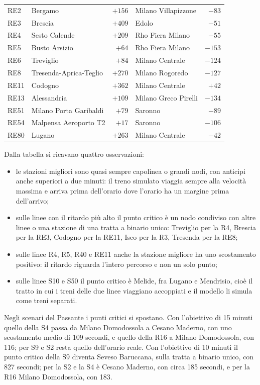 {\begin{longtable}{@{}l>{\raggedright\arraybackslash}p{}r>{\raggedright\arraybackslash}p{}r@{}}
	RE2 & Bergamo & $+156$ & Milano Villapizzone & $-83$ \\
	RE3 & Brescia & $+409$ & Edolo & $-51$ \\
	RE4 & Sesto Calende & $+209$ & Rho Fiera Milano & $-55$ \\
	RE5 & Busto Arsizio & $+64$ & Rho Fiera Milano & $-153$ \\
	RE6 & Treviglio & $+84$ & Milano Centrale & $-124$ \\
	RE8 & Tresenda-Aprica-Teglio & $+270$ & Milano Rogoredo & $-127$ \\
	RE11 & Codogno & $+362$ & Milano Centrale & $+42$ \\
	RE13 & Alessandria & $+109$ & Milano Greco Pirelli & $-134$ \\
	RE51 & Milano Porta Garibaldi & $+79$ & Saronno & $-89$ \\
	RE54 & Malpensa Aeroporto T2 & $+17$ & Saronno & $-106$ \\
	RE80 & Lugano & $+263$ & Milano Centrale & $-42$ \\
	\bottomrule
\end{longtable}
}

Dalla tabella si ricavano quattro osservazioni:
\begin{itemize}
	\item le stazioni migliori sono quasi sempre capolinea o grandi nodi, con anticipi anche superiori a due minuti: il treno simulato viaggia sempre alla velocità massima e arriva prima dell'orario dove l'orario ha un margine prima dell'arrivo;
	\item sulle linee con il ritardo più alto il punto critico è un nodo condiviso con altre linee o una stazione di una tratta a binario unico: Treviglio per la R4, Brescia per la RE3, Codogno per la RE11, Iseo per la R3, Tresenda per la RE8;
	\item sulle linee R4, R5, R40 e RE11 anche la stazione migliore ha uno scostamento positivo: il ritardo riguarda l'intero percorso e non un solo punto;
	\item sulle linee S10 e S50 il punto critico è Melide, fra Lugano e Mendrisio, cioè il tratto in cui i treni delle due linee viaggiano accoppiati e il modello li simula come treni separati.
\end{itemize}
Negli scenari del Passante i punti critici si spostano. Con l'obiettivo di 15 minuti quello della S4 passa da Milano Domodossola a Cesano Maderno, con uno scostamento medio di 109 secondi, e quello della R16 a Milano Domodossola, con 116; per S9 e S2 resta quello dell'orario reale. Con l'obiettivo di 10 minuti il punto critico della S9 diventa Seveso Baruccana, sulla tratta a binario unico, con 827 secondi; per la S2 e la S4 è Cesano Maderno, con circa 185 secondi, e per la R16 Milano Domodossola, con 183.

